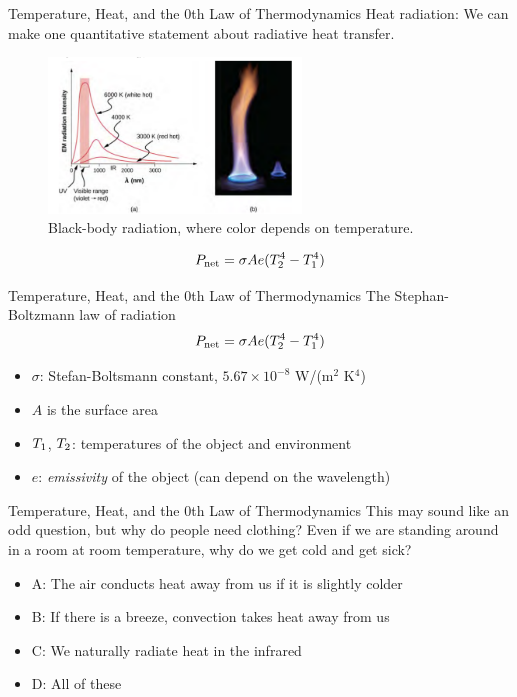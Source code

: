 \documentclass{beamer}
\begin{document}
\begin{frame}{Temperature, Heat, and the 0th Law of Thermodynamics}
\small
Heat radiation: We can make one quantitative statement about radiative heat transfer.
\begin{figure}
\centering
\includegraphics[width=0.6\textwidth]{figures/heat3.png}
\caption{\label{fig:heat3} Black-body radiation, where color depends on temperature.}
\end{figure}
\begin{equation}
P_{\rm net} = \sigma A e (T_{\rm 2}^4 - T_{\rm 1}^4)
\end{equation}
\end{frame}

\begin{frame}{Temperature, Heat, and the 0th Law of Thermodynamics}
\alert{The Stephan-Boltzmann} law of radiation
\begin{equation}
P_{\rm net} = \sigma A e (T_{\rm 2}^4 - T_{\rm 1}^4)
\end{equation}
\begin{itemize}
\item $\sigma$: Stefan-Boltsmann constant, $5.67 \times 10^{-8}$ W/(m$^2$ K$^4$)
\item $A$ is the surface area
\item $T_{\rm 1}$, $T_{\rm 2}$: temperatures of the object and environment
\item $e$: \textit{emissivity} of the object (can depend on the wavelength)
\end{itemize}
\end{frame}

\begin{frame}{Temperature, Heat, and the 0th Law of Thermodynamics}
This may sound like an odd question, but why do people need clothing?  Even if we are standing around in a room at room temperature, why do we get cold and get sick?
\begin{itemize}
\item A: The air conducts heat away from us if it is slightly colder
\item B: If there is a breeze, convection takes heat away from us
\item C: We naturally radiate heat in the infrared
\item D: All of these
\end{itemize}
\end{frame}
\end{document}
